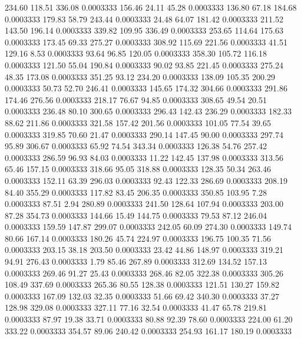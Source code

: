  234.60  118.51  336.08   0.0003333
 156.46   24.11   45.28   0.0003333
 136.80   67.18  184.68   0.0003333
 179.83   58.79  243.44   0.0003333
  24.48   64.07  181.42   0.0003333
 211.52  143.50  196.14   0.0003333
 339.82  109.95  336.49   0.0003333
 253.65  114.64  175.63   0.0003333
 173.45   69.33  275.27   0.0003333
 308.92  115.69  221.56   0.0003333
  41.51  129.16    8.53   0.0003333
  93.64   96.85  120.05   0.0003333
 358.30  105.72  116.18   0.0003333
 121.50   55.04  190.84   0.0003333
  90.02   93.85  221.45   0.0003333
 275.24   48.35  173.08   0.0003333
 351.25   93.12  234.20   0.0003333
 138.09  105.35  200.29   0.0003333
  50.73   52.70  246.41   0.0003333
 145.65  174.32  304.66   0.0003333
 291.86  174.46  276.56   0.0003333
 218.17   76.67   94.85   0.0003333
 308.65   49.54   20.51   0.0003333
 236.48   80.10  300.65   0.0003333
 296.43  142.43  236.29   0.0003333
 182.33   88.62  211.86   0.0003333
 321.58  157.42  201.56   0.0003333
 101.05   77.54   39.65   0.0003333
 319.85   70.60   21.47   0.0003333
 290.14  147.45   90.00   0.0003333
 297.74   95.89  306.67   0.0003333
  65.92   74.54  343.34   0.0003333
 126.38   54.76  257.42   0.0003333
 286.59   96.93   84.03   0.0003333
  11.22  142.45  137.98   0.0003333
 313.56   65.46  157.15   0.0003333
 318.66   95.05  318.88   0.0003333
 128.35   50.34  263.46   0.0003333
 152.11   63.39  296.03   0.0003333
  92.43  122.33  286.69   0.0003333
 208.19   84.40  355.29   0.0003333
 117.82   83.45  206.35   0.0003333
 350.85  103.95    7.28   0.0003333
  87.51    2.94  280.89   0.0003333
 241.50  128.64  107.94   0.0003333
 203.00   87.28  354.73   0.0003333
 144.66   15.49  144.75   0.0003333
  79.53   87.12  246.04   0.0003333
 159.59  147.87  299.07   0.0003333
 242.05   60.09  274.30   0.0003333
 149.74   80.66  167.14   0.0003333
 180.26   45.74  224.97   0.0003333
 196.75  100.35   71.56   0.0003333
 203.15   38.18  203.50   0.0003333
  23.42   44.86  148.97   0.0003333
 319.21   94.91  276.43   0.0003333
   1.79   85.46  267.89   0.0003333
 312.69  134.52  157.13   0.0003333
 269.46   91.27   25.43   0.0003333
 268.46   82.05  322.38   0.0003333
 305.26  108.49  337.69   0.0003333
 265.36   80.55  128.38   0.0003333
 121.51  130.27  159.82   0.0003333
 167.09  132.03   32.35   0.0003333
  51.66   69.42  340.30   0.0003333
  37.27  128.98  329.08   0.0003333
 327.11   77.16   32.54   0.0003333
  41.47   65.78  219.81   0.0003333
  87.97   19.38   33.71   0.0003333
  80.88   92.39   78.60   0.0003333
 224.00   61.20  333.22   0.0003333
 354.57   89.06  240.42   0.0003333
 254.93  161.17  180.19   0.0003333
